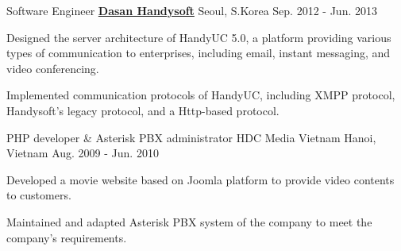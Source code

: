 \begin{cventries}
  \cventry
    {Software Engineer} %
    {\href{http://www.handysoft.co.kr}{\bf Dasan Handysoft}} %
    {Seoul, S.Korea} %
    {Sep. 2012 - Jun. 2013} %
    {
      \begin{cvitems} %
        \item  Designed the server architecture of HandyUC 5.0, a platform providing various types of communication to enterprises, including email, instant messaging, and video conferencing.
        \item Implemented communication protocols of HandyUC, including XMPP protocol, Handysoft's legacy protocol, and a Http-based protocol.
      \end{cvitems}
    }

  \cventry
    {PHP developer \& Asterisk PBX administrator} %
    {HDC Media Vietnam} %
    {Hanoi, Vietnam} %
    {Aug. 2009 - Jun. 2010} %
    {
      \begin{cvitems} %
       \item {Developed a movie website based on Joomla platform to provide video contents to customers. }
       \item { Maintained and adapted Asterisk PBX system of the company to meet the company's requirements.}
      \end{cvitems}
    }

\end{cventries}

